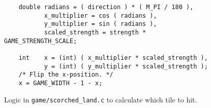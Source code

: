 \begin{figure}[ht]
\centering
\lstset{language=C,basicstyle=\ttfamily,numbers=left,firstnumber=42}
\begin{lstlisting}
    double radians = ( direction ) * ( M_PI / 180 ),
           x_multiplier = cos ( radians ),
           y_multiplier = sin ( radians ),
           scaled_strength = strength *  GAME_STRENGTH_SCALE;

    int    x = (int) ( x_multiplier * scaled_strength ),
           y = (int) ( y_multiplier * scaled_strength );
    /* Flip the x-position. */
    x = GAME_WIDTH - 1 - x;
\end{lstlisting}
\caption{Logic in \texttt{game/scorched\_land.c} to calculate which tile to hit.}
\label{lst:pos-code}
\end{figure}
